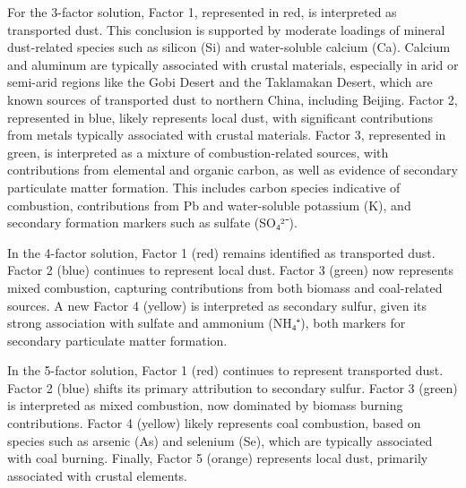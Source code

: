 \documentclass[
  letterpaper,
  DIV=11,
  numbers=noendperiod]{scrartcl}
\begin{document}
For the 3-factor solution, Factor 1, represented in red, is interpreted
as transported dust. This conclusion is supported by moderate loadings
of mineral dust-related species such as silicon (Si) and water-soluble
calcium (Ca). Calcium and aluminum are typically associated with crustal
materials, especially in arid or semi-arid regions like the Gobi Desert
and the Taklamakan Desert, which are known sources of transported dust
to northern China, including Beijing. Factor 2, represented in blue,
likely represents local dust, with significant contributions from metals
typically associated with crustal materials. Factor 3, represented in
green, is interpreted as a mixture of combustion-related sources, with
contributions from elemental and organic carbon, as well as evidence of
secondary particulate matter formation. This includes carbon species
indicative of combustion, contributions from Pb and water-soluble
potassium (K), and secondary formation markers such as sulfate (SO₄²⁻).

In the 4-factor solution, Factor 1 (red) remains identified as
transported dust. Factor 2 (blue) continues to represent local dust.
Factor 3 (green) now represents mixed combustion, capturing
contributions from both biomass and coal-related sources. A new Factor 4
(yellow) is interpreted as secondary sulfur, given its strong
association with sulfate and ammonium (NH₄⁺), both markers for secondary
particulate matter formation.

In the 5-factor solution, Factor 1 (red) continues to represent
transported dust. Factor 2 (blue) shifts its primary attribution to
secondary sulfur. Factor 3 (green) is interpreted as mixed combustion,
now dominated by biomass burning contributions. Factor 4 (yellow) likely
represents coal combustion, based on species such as arsenic (As) and
selenium (Se), which are typically associated with coal burning.
Finally, Factor 5 (orange) represents local dust, primarily associated
with crustal elements.
\end{document}
